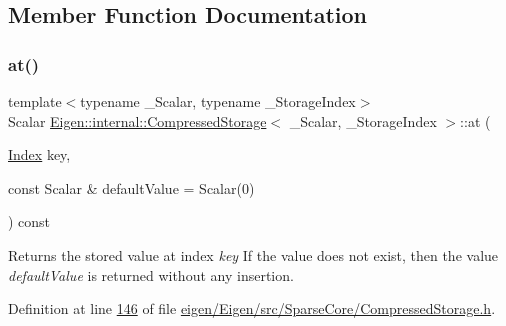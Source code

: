 \subsection{Member Function Documentation}
\mbox{\label{class_eigen_1_1internal_1_1_compressed_storage_a0fe151c0217177fd43df764e8e0cdec2}} 
\subsubsection{\texorpdfstring{at()}{at()}\hspace{0.1cm}{\footnotesize\ttfamily [1/2]}}
{\footnotesize\ttfamily template$<$typename \+\_\+\+Scalar, typename \+\_\+\+Storage\+Index$>$ \\
Scalar \hyperlink{class_eigen_1_1internal_1_1_compressed_storage}{Eigen\+::internal\+::\+Compressed\+Storage}$<$ \+\_\+\+Scalar, \+\_\+\+Storage\+Index $>$\+::at (\begin{DoxyParamCaption}\item[{\hyperlink{namespace_eigen_a62e77e0933482dafde8fe197d9a2cfde}{Index}}]{key,  }\item[{const Scalar \&}]{default\+Value = {\ttfamily Scalar(0)} }\end{DoxyParamCaption}) const\hspace{0.3cm}{\ttfamily [inline]}}

\begin{DoxyReturn}{Returns}
the stored value at index {\itshape key} If the value does not exist, then the value {\itshape default\+Value} is returned without any insertion. 
\end{DoxyReturn}


Definition at line \hyperlink{eigen_2_eigen_2src_2_sparse_core_2_compressed_storage_8h_source_l00146}{146} of file \hyperlink{eigen_2_eigen_2src_2_sparse_core_2_compressed_storage_8h_source}{eigen/\+Eigen/src/\+Sparse\+Core/\+Compressed\+Storage.\+h}.

\mbox{\label{class_eigen_1_1internal_1_1_compressed_storage_a0fe151c0217177fd43df764e8e0cdec2}} 
